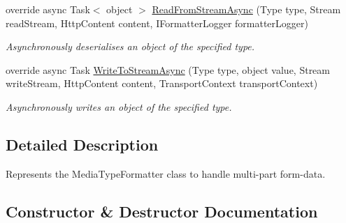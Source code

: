 \begin{DoxyCompactItemize}
override async Task$<$ object $>$ \hyperlink{classCqrs_1_1WebApi_1_1Formatters_1_1FormMultipart_1_1FormMultipartEncodedMediaTypeFormatter_a4599833b528ecb762d9d5d2c72b11d90_a4599833b528ecb762d9d5d2c72b11d90}{Read\+From\+Stream\+Async} (Type type, Stream read\+Stream, Http\+Content content, I\+Formatter\+Logger formatter\+Logger)
\begin{DoxyCompactList}\small\item\em Asynchronously deserialises an object of the specified type. \end{DoxyCompactList}\item 
override async Task \hyperlink{classCqrs_1_1WebApi_1_1Formatters_1_1FormMultipart_1_1FormMultipartEncodedMediaTypeFormatter_aced660e9ab818558fc5728ec82e2434e_aced660e9ab818558fc5728ec82e2434e}{Write\+To\+Stream\+Async} (Type type, object value, Stream write\+Stream, Http\+Content content, Transport\+Context transport\+Context)
\begin{DoxyCompactList}\small\item\em Asynchronously writes an object of the specified type. \end{DoxyCompactList}\end{DoxyCompactItemize}


\subsection{Detailed Description}
Represents the Media\+Type\+Formatter class to handle multi-\/part form-\/data. 



\subsection{Constructor \& Destructor Documentation}
\mbox{\label{classCqrs_1_1WebApi_1_1Formatters_1_1FormMultipart_1_1FormMultipartEncodedMediaTypeFormatter_a73f24dec1824edeaaa019bc0dfa1b2e2_a73f24dec1824edeaaa019bc0dfa1b2e2}} 
